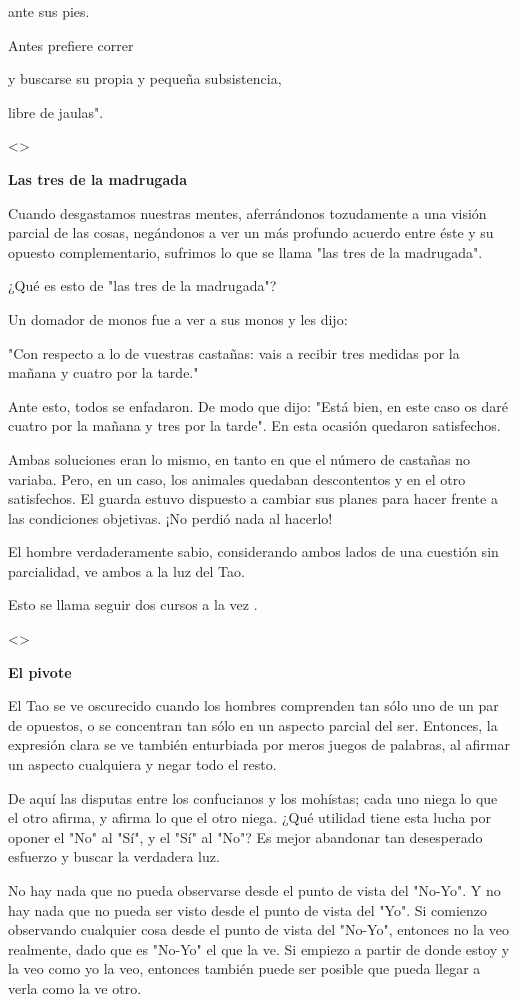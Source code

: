 ante sus pies.

Antes prefiere correr

y buscarse su propia y pequeña subsistencia,

libre de jaulas".

\textless\textgreater{}

\textbf{{Las tres de la madrugada}}

Cuando desgastamos nuestras mentes, aferrándonos tozudamente a una
visión parcial de las cosas, negándonos a ver un más profundo acuerdo
entre éste y su opuesto complementario, sufrimos lo que se llama "las
tres de la madrugada".

¿Qué es esto de "las tres de la madrugada"?

Un domador de monos fue a ver a sus monos y les dijo:

"Con respecto a lo de vuestras castañas: vais a recibir tres medidas por
la mañana y cuatro por la tarde."

Ante esto, todos se enfadaron. De modo que dijo: "Está bien, en este
caso os daré cuatro por la mañana y tres por la tarde". En esta ocasión
quedaron satisfechos.

Ambas soluciones eran lo mismo, en tanto en que el número de castañas no
variaba. Pero, en un caso, los animales quedaban descontentos y en el
otro satisfechos. El guarda estuvo dispuesto a cambiar sus planes para
hacer frente a las condiciones objetivas. ¡No perdió nada al hacerlo!

El hombre verdaderamente sabio, considerando ambos lados de una cuestión
sin parcialidad, ve ambos a la luz del Tao.

Esto se llama seguir dos cursos a la vez .

\textless\textgreater{}

\textbf{{El pivote}}

El Tao se ve oscurecido cuando los hombres comprenden tan sólo uno de un
par de opuestos, o se concentran tan sólo en un aspecto parcial del ser.
Entonces, la expresión clara se ve también enturbiada por meros juegos
de palabras, al afirmar un aspecto cualquiera y negar todo el resto.

De aquí las disputas entre los confucianos y los mohístas; cada uno
niega lo que el otro afirma, y afirma lo que el otro niega. ¿Qué
utilidad tiene esta lucha por oponer el "No" al "Sí", y el "Sí" al "No"?
Es mejor abandonar tan desesperado esfuerzo y buscar la verdadera luz.

No hay nada que no pueda observarse desde el punto de vista del "No-Yo".
Y no hay nada que no pueda ser visto desde el punto de vista del "Yo".
Si comienzo observando cualquier cosa desde el punto de vista del
"No-Yo", entonces no la veo realmente, dado que es "No-Yo" el que la ve.
Si empiezo a partir de donde estoy y la veo como yo la veo, entonces
también puede ser posible que pueda llegar a verla como la ve otro.

